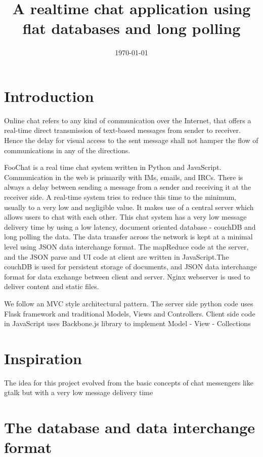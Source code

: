 \documentclass[a4paper,11pt,conference]{IEEEtran}
\title{A realtime chat application using flat databases and long polling}
\date{\today}
\author{
	\IEEEauthorblockN{Jaseem Abid}
	\IEEEauthorblockA{B090264CS \\ jaseemabid@gmail.com}
\and 
	\IEEEauthorblockN{Irene George}
	\IEEEauthorblockA{B090234CS \\ plasid\_91@yahoo.co.in}
\and 
	\IEEEauthorblockN{Jincy Abraham}
	\IEEEauthorblockA{B090238CS \\ jincy.a@gmail.com }
\and
	\IEEEauthorblockN{Gayathri PP}
	\IEEEauthorblockA{B090412CS \\ pp.gayathri4u2@gmail.com }
}
\begin{document}
	\maketitle
	\vspace{100px}

	\section{Introduction}

	Online chat refers to any kind of communication over the Internet, that offers a real-time direct transmission of text-based messages from sender to receiver. Hence the delay for visual access to the sent message shall not hamper the flow of communications in any of the directions.

	FooChat is a real time chat system written in Python and JavaScript. Communication in the web is primarily with IMs, emails, and IRCs. There is always a delay between sending a message from a sender and receiving it at the receiver side. A real-time system tries to reduce this time to the minimum, usually to a very low and negligible value. It makes use of a central server which allows users to chat with each other. This chat system has a very low message delivery time by using a low latency, document oriented database - couchDB and long polling the data. The data transfer across the network is kept at a minimal level using JSON data interchange format. The mapReduce code at the server, and the JSON parse and UI code at client are written in JavaScript.The couchDB is used for persistent storage of documents, and JSON data interchange format for data exchange between client and server. Nginx webserver is used to deliver content and static files.

	We follow an MVC style architectural pattern. The server side python code uses Flask framework and traditional Models, Views and Controllers. Client side code in JavaScript uses Backbone.js library to implement Model - View - Collections


	\section{Inspiration}
	The idea for this project evolved from the basic concepts of chat messengers like gtalk but with a very low message delivery time


	\section{The database and data interchange format}
\end{document}
